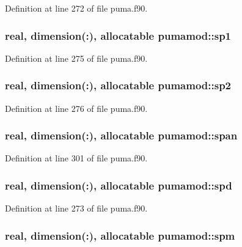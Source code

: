 \-Definition at line 272 of file puma.\-f90.

\hypertarget{classpumamod_a8509c5063893002e614541f3f546db2f}{
\subsubsection[{sp1}]{\setlength{\rightskip}{0pt plus 5cm}real, dimension(\-:), allocatable {\bf pumamod\-::sp1}}}
\label{classpumamod_a8509c5063893002e614541f3f546db2f}


\-Definition at line 275 of file puma.\-f90.

\hypertarget{classpumamod_ac0a89b4b892f00ce4069b1adc76ac1ad}{
\subsubsection[{sp2}]{\setlength{\rightskip}{0pt plus 5cm}real, dimension(\-:), allocatable {\bf pumamod\-::sp2}}}
\label{classpumamod_ac0a89b4b892f00ce4069b1adc76ac1ad}


\-Definition at line 276 of file puma.\-f90.

\hypertarget{classpumamod_aaf3b11d526905c319b065f60804ba566}{
\subsubsection[{span}]{\setlength{\rightskip}{0pt plus 5cm}real, dimension(\-:), allocatable {\bf pumamod\-::span}}}
\label{classpumamod_aaf3b11d526905c319b065f60804ba566}


\-Definition at line 301 of file puma.\-f90.

\hypertarget{classpumamod_a99ec3c13cdd619b700160372a330f531}{
\subsubsection[{spd}]{\setlength{\rightskip}{0pt plus 5cm}real, dimension(\-:), allocatable {\bf pumamod\-::spd}}}
\label{classpumamod_a99ec3c13cdd619b700160372a330f531}


\-Definition at line 273 of file puma.\-f90.

\hypertarget{classpumamod_a2bc3d91e2e9c16048446dbd12448ed2d}{
\subsubsection[{spm}]{\setlength{\rightskip}{0pt plus 5cm}real, dimension(\-:), allocatable {\bf pumamod\-::spm}}}
\label{classpumamod_a2bc3d91e2e9c16048446dbd12448ed2d}


